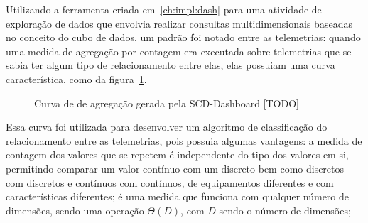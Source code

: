 Utilizando a ferramenta criada em~\ref{ch:impl:dash} para uma atividade de exploração de dados que envolvia realizar consultas multidimensionais baseadas no conceito do cubo de dados, um padrão foi notado entre as telemetrias: quando uma medida de agregação por contagem era executada sobre telemetrias que se sabia ter algum tipo de relacionamento entre elas, elas possuiam uma curva característica, como da figura~\ref{fig:scdsimilaritygraph}.

\begin{figure}[ht]
	\caption{\color{red} Curva de de agregação gerada pela SCD-Dashboard [TODO]}
	\vspace{6mm}
	\begin{center}
	\end{center}
	\vspace{4mm}
	\legenda{}
	\label{fig:scdsimilaritygraph}
\end{figure}

Essa curva foi utilizada para desenvolver um algoritmo de classificação do relacionamento entre as telemetrias, pois possuia algumas vantagens: a medida de contagem dos valores que se repetem é independente do tipo dos valores em si, permitindo comparar um valor contínuo com um discreto bem como discretos com discretos e contínuos com contínuos, de equipamentos diferentes e com características diferentes; é uma medida que funciona com qualquer número de dimensões, sendo uma operação $\Theta(D)$, com $D$ sendo o número de dimensões; 

